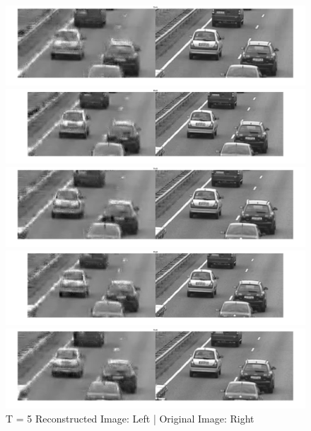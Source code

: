 \documentclass{article}
\begin{document}
\begin{figure}[!htb]
	\centering
	\begin{minipage}[bt]{0.4\linewidth}
		\centering
			\includegraphics[scale=0.07]{t5/t1.jpg}
			\caption{$t = 1$}
			\includegraphics[scale=0.07]{t5/t2.jpg}
			\caption{$t = 2$}
			\includegraphics[scale=0.07]{t5/t3.jpg}
			\caption{$t = 3$}
	\end{minipage}
\begin{minipage}[!htb]{0.5\linewidth}
\centering
	\includegraphics[scale=0.06]{t5/t4.jpg}
	\caption{$t = 4$}
	\includegraphics[scale=0.06]{t5/t5.jpg}
	\caption{$t = 5$}
\end{minipage}
\caption{T = 5  Reconstructed Image: Left | Original Image: Right}
\end{figure}
\end{document}
